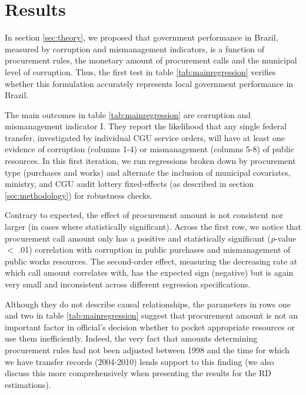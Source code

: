 \documentclass[11pt]{article}
\begin{document}
\section{Results} \label{sec:result}

In section \ref{sec:theory}, we proposed that government performance in Brazil, measured by corruption and mismanagement indicators, is a function of procurement rules, the monetary amount of procurement calls and the municipal level of corruption. Thus, the first test in table \ref{tab:mainregression} verifies whether this formulation accurately represents local government performance in Brazil.

The main outcomes in table \ref{tab:mainregression} are corruption and mismanagement indicator I. They report the likelihood that any single federal transfer, investigated by individual CGU service orders, will have at least one evidence of corruption (columns 1-4) or mismanagement (columns 5-8) of public resources. In this first iteration, we run regressions broken down by procurement type (purchases and works) and alternate the inclusion of municipal covariates, ministry, and CGU audit lottery fixed-effects (as described in section \ref{sec:methodology}) for robustness checks.

Contrary to expected, the effect of procurement amount is not consistent nor larger (in cases where statistically significant). Across the first row, we notice that procurement call amount only has a positive and statistically significant (\emph{p}-value $<$ .01) correlation with corruption in public purchases and mismanagement of public works resources. The second-order effect, measuring the decreasing rate at which call amount correlates with, has the expected sign (negative) but is again very small and inconsistent across different regression specifications.
\clearpage


Although they do not describe causal relationships, the parameters in rows one and two in table \ref{tab:mainregression} suggest that procurement amount is not an important factor in official's decision whether to pocket appropriate resources or use them inefficiently. Indeed, the very fact that amounts determining procurement rules had not been adjusted between 1998 and the time for which we have transfer records (2004-2010) lends support to this finding (we also discuss this more comprehensively when presenting the results for the RD estimations).
\end{document}
